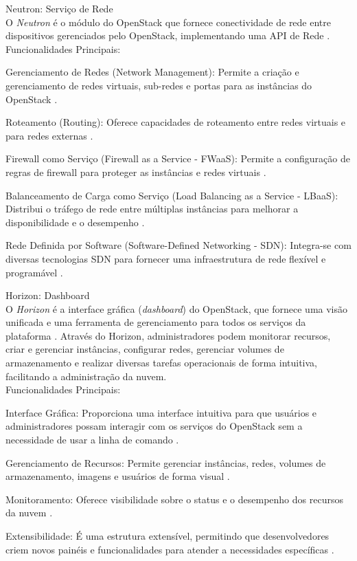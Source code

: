 \begin{description}
    \item Neutron: Serviço de Rede\\
    O \textit{Neutron} é o módulo do OpenStack que fornece conectividade de rede entre dispositivos gerenciados pelo OpenStack, implementando uma API de Rede \cite{openstackneutron}.\\
    Funcionalidades Principais:
    \begin{description}
        \item Gerenciamento de Redes (Network Management): Permite a criação e gerenciamento de redes virtuais, sub-redes e portas para as instâncias do OpenStack \cite{openstackneutron}.
        \item Roteamento (Routing): Oferece capacidades de roteamento entre redes virtuais e para redes externas \cite{openstackneutron}.
        \item Firewall como Serviço (Firewall as a Service - FWaaS): Permite a configuração de regras de firewall para proteger as instâncias e redes virtuais \cite{openstackneutron}.
        \item Balanceamento de Carga como Serviço (Load Balancing as a Service - LBaaS): Distribui o tráfego de rede entre múltiplas instâncias para melhorar a disponibilidade e o desempenho \cite{openstackneutron}.
        \item Rede Definida por Software (Software-Defined Networking - SDN): Integra-se com diversas tecnologias SDN para fornecer uma infraestrutura de rede flexível e programável \cite{openstackneutron}.
    \end{description}

    \item Horizon: Dashboard\\
    O \textit{Horizon} é a interface gráfica (\textit{dashboard}) do OpenStack, que fornece uma visão unificada e uma ferramenta de gerenciamento para todos os serviços da plataforma \cite{openstackhorizon}. Através do Horizon, administradores podem monitorar recursos, criar e gerenciar instâncias, configurar redes, gerenciar volumes de armazenamento e realizar diversas tarefas operacionais de forma intuitiva, facilitando a administração da nuvem.\\
    Funcionalidades Principais:
    \begin{description}
        \item Interface Gráfica: Proporciona uma interface intuitiva para que usuários e administradores possam interagir com os serviços do OpenStack sem a necessidade de usar a linha de comando \cite{openstackhorizon}.
        \item Gerenciamento de Recursos: Permite gerenciar instâncias, redes, volumes de armazenamento, imagens e usuários de forma visual \cite{openstackhorizon}.
        \item Monitoramento: Oferece visibilidade sobre o status e o desempenho dos recursos da nuvem \cite{openstackhorizon}.
        \item Extensibilidade: É uma estrutura extensível, permitindo que desenvolvedores criem novos painéis e funcionalidades para atender a necessidades específicas \cite{openstackhorizon}.
    \end{description}


\end{description}
